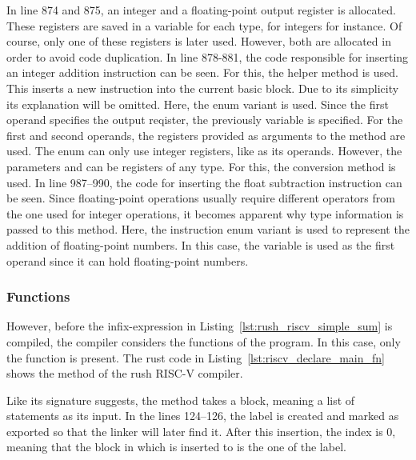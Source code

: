 In line 874 and 875, an integer and a floating-point output register is allocated.
These registers are saved in a variable for each type,  for integers for instance.
Of course, only one of these registers is later used.
However, both are allocated in order to avoid code duplication.
In line 878-881, the code responsible for inserting an integer addition instruction can be seen.
For this, the  helper method is used.
This inserts a new instruction into the current basic block.
Due to its simplicity its explanation will be omitted.
Here, the  enum variant is used.
Since the first operand specifies the output reqister, the previously  variable is specified.
For the first and second operands, the registers provided as arguments to the  method are used.
The  enum can only use integer registers, like  as its operands.
However, the parameters  and  can be registers of any type.
For this, the conversion method  is used.
In line 987--990, the code for inserting the float subtraction instruction can be seen.
Since floating-point operations usually require different operators from the one used for integer operations,
it becomes apparent why type information is passed to this method.
Here, the  instruction enum variant is used to represent the addition of floating-point numbers.
In this case, the variable  is used as the first operand since it can hold floating-point numbers.

\subsubsection{Functions}

However, before the infix-expression in Listing~\ref{lst:rush_riscv_simple_sum} is compiled,
the compiler considers the functions of the program.
In this case, only the  function is present.
The rust code in Listing~\ref{lst:riscv_declare_main_fn} shows the  method of the rush RISC-V compiler.


Like its signature suggests, the method takes a block, meaning a list of statements as its input.
In the lines 124--126, the  label is created and marked as exported so that the linker will later find it.
After this insertion, the  index is 0, meaning that the block in which is inserted to is the one of the  label.


